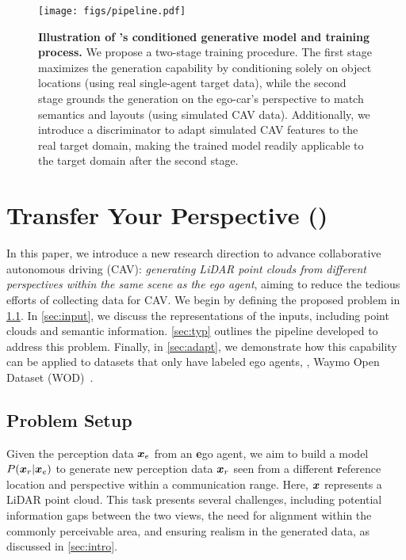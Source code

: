\begin{figure}
\centering
\texttt{[image: figs/pipeline.pdf]}
\vspace{-6mm}
\caption{
\label{fig:pipeline}
\small \textbf{Illustration of \ours's conditioned generative model and training process.} We propose a two-stage training procedure. The first stage maximizes the generation capability by conditioning solely on object locations (using real single-agent target data), while the second stage grounds the generation on the ego-car's perspective to match semantics and layouts (using simulated CAV data). Additionally, we introduce a discriminator to adapt simulated CAV features to the real target domain, 
making the trained model readily applicable to the target domain after the second stage. 
}
\vspace{-5mm}
\end{figure}

\section{Transfer Your Perspective (\ours)}

\label{sec:method}
In this paper, we introduce a new research direction to advance collaborative autonomous driving (CAV): \emph{generating LiDAR point clouds from different perspectives within the same scene as the ego agent}, aiming to reduce the tedious efforts of collecting data for CAV. We begin by defining the proposed problem in \cref{sec:setup}. In \cref{sec:input}, we discuss the representations of the inputs, including point clouds and semantic information. \cref{sec:typ} outlines the pipeline developed to address this problem. Finally, in \cref{sec:adapt}, we demonstrate how this capability can be applied to datasets that only have labeled ego agents, \eg, Waymo Open Dataset (WOD)~\citep{sun2020waymo}.


 
\subsection{Problem Setup}
\label{sec:setup}
Given the perception data ${\bm{x}}_e$ from an \textbf{e}go agent, we aim to build a model $P({\bm{x}}_r|{\bm{x}}_e)$ to generate new perception data ${\bm{x}}_r$ seen from a different \textbf{r}eference location and perspective within a communication range. Here, ${\bm{x}}$ represents a LiDAR point cloud. This task presents several challenges, including potential information gaps between the two views, the need for alignment within the commonly perceivable area, and ensuring realism in the generated data, as discussed in \cref{sec:intro}.


